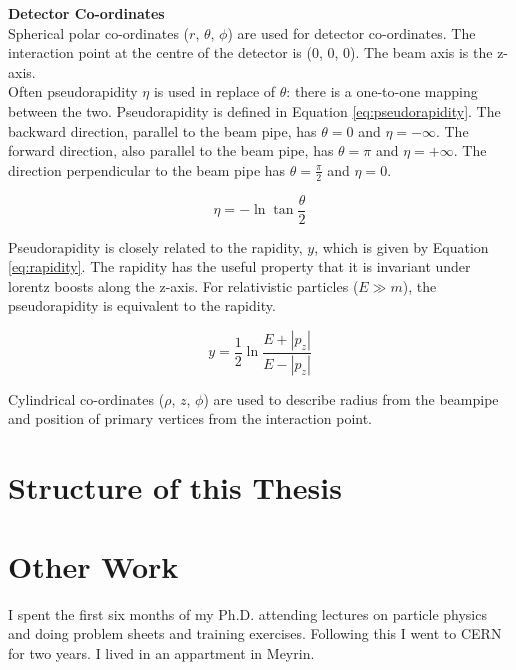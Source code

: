{\bf Detector Co-ordinates} \\

Spherical polar co-ordinates ($r$, $\theta$, $\phi$) are used for detector
co-ordinates. The interaction point at the centre of the detector is (0, 0, 0).
The beam axis is the z-axis. \\

Often pseudorapidity $\eta$ is used in replace of $\theta$: there is a 
one-to-one mapping between the two. Pseudorapidity is defined in Equation 
\ref{eq:pseudorapidity}. The backward direction, parallel to the beam pipe, has 
$\theta = 0$ and $\eta = -\infty$. The forward direction, also parallel to the
beam pipe, has $\theta = \pi$ and $\eta = +\infty$. The direction perpendicular 
to the beam pipe has $\theta = \frac{\pi}{2}$ and $\eta = 0$. 

\begin{equation}
\eta = -\ln\tan\frac{\theta}{2}
\label{eq:pseudorapidity}
\end{equation}

Pseudorapidity is closely related to the rapidity, $y$, which is given by
Equation \ref{eq:rapidity}. The rapidity has the useful property that it is
invariant under lorentz boosts along the z-axis. For relativistic particles ($E 
\gg m$), the pseudorapidity is equivalent to the rapidity.

\begin{equation}
y = \frac{1}{2}\ln\frac{E + |p_{z}|}{E - |p_{z}|}
\label{eq:rapidity}
\end{equation}

Cylindrical co-ordinates ($\rho$, $z$, $\phi$) are used to describe radius from 
the beampipe and position of primary vertices from the interaction point.

\section{Structure of this Thesis}



\section{Other Work}

I spent the first six months of my Ph.D. attending lectures on particle physics 
and doing problem sheets and training exercises. Following this I went to CERN
for two years. I lived in an appartment in Meyrin. \\

